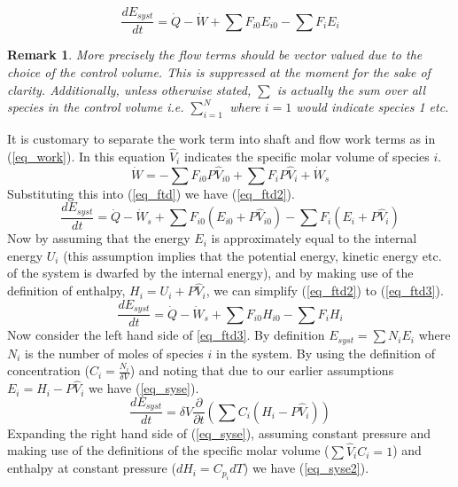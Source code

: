 \documentclass[11pt,fleqn]{article}
\theoremstyle{defstyle}
\newtheorem{rmrk}{Remark}[section]
\begin{document}
\begin{equation}
\frac{d E_{syst}}{dt} = \dot{Q} - \dot{W} + \sum F_{i0}E_{i0} -\sum F_{i}E_{i}
\label{eq_ftd}
\end{equation}
\begin{rmrk}
More precisely the flow terms should be vector valued due to the choice of the control volume. This is suppressed at the moment for the sake of clarity. Additionally, unless otherwise stated, $\sum$ is actually the sum over all species in the control volume i.e. $\sum_{i=1}^{N}$ where $i=1$ would indicate species 1 etc. 
\end{rmrk}
It is customary to separate the work term into shaft and flow work terms as in (\ref{eq_work}). In this equation $\hat{V}_i$ indicates the specific molar volume of species $i$.
\begin{equation}
\dot{W} = -\sum F_{i0}P\hat{V}_{i0} + \sum F_{i}P\hat{V}_{i} + \dot{W}_s
\label{eq_work} 
\end{equation}
Substituting this into (\ref{eq_ftd}) we have (\ref{eq_ftd2}).
\begin{equation}
\frac{d E_{syst}}{dt} = \dot{Q} - \dot{W}_s + \sum F_{i0}(E_{i0}+P\hat{V}_{i0}) -\sum F_{i}(E_{i}+P\hat{V}_{i})
\label{eq_ftd2}
\end{equation}
Now by assuming that the energy $E_i$ is approximately equal to the internal energy $U_i$ (this assumption implies that the potential energy, kinetic energy etc. of the system is dwarfed by the internal energy), and by making use of the definition of enthalpy, $H_i = U_i + P\hat{V}_i$, we can simplify (\ref{eq_ftd2}) to (\ref{eq_ftd3}).
\begin{equation}
\frac{d E_{syst}}{dt} = \dot{Q} - \dot{W}_s + \sum F_{i0}H_{i0} -\sum F_{i}H_{i}
\label{eq_ftd3}
\end{equation} 
Now consider the left hand side of \ref{eq_ftd3}. By definition $E_{syst} = \sum N_iE_i$ where $N_i$ is the number of moles of species $i$ in the system. By using the definition of concentration ($C_i = \frac{N_i}{\delta V}$) and noting that due to our earlier assumptions $E_i = H_i - P\hat{V}_i$  we have (\ref{eq_syse}).
\begin{equation}
\frac{d E_{syst}}{dt} = \delta V \frac{\partial}{\partial t}(\sum C_i (H_i - P\hat{V}_i))
\label{eq_syse}
\end{equation}
Expanding the right hand side of (\ref{eq_syse}), assuming constant pressure and making use of the definitions of the specific molar volume ($\sum \hat{V}_iC_i = 1$) and enthalpy at constant pressure ($dH_i = C_{p_i}dT$) we have (\ref{eq_syse2}).
\end{document}
